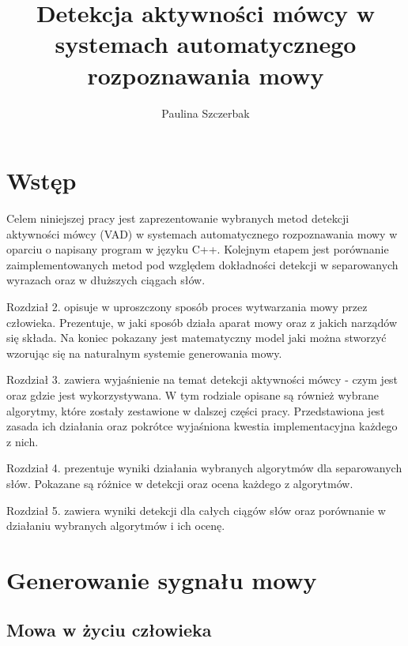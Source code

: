\documentclass[eng,printmode]{mgr}
\title{Detekcja aktywności mówcy w systemach automatycznego rozpoznawania mowy}
\author{Paulina Szczerbak}
\begin{document}

\maketitle %

\tableofcontents %

\chapter{Wstęp}
Celem niniejszej pracy jest zaprezentowanie wybranych metod detekcji aktywności mówcy (VAD) w systemach automatycznego rozpoznawania mowy w oparciu o napisany program w języku C++. Kolejnym etapem jest porównanie zaimplementowanych metod pod względem dokładności detekcji w separowanych wyrazach oraz w dłuższych ciągach słów.

Rozdział 2. opisuje w uproszczony sposób proces wytwarzania mowy przez człowieka. Prezentuje, w jaki sposób działa aparat mowy oraz z jakich narządów się składa. Na koniec pokazany jest matematyczny model jaki można stworzyć wzorując się na naturalnym systemie generowania mowy.

Rozdział 3. zawiera wyjaśnienie na temat detekcji aktywności mówcy - czym jest oraz gdzie jest wykorzystywana. W tym rodziale opisane są również wybrane algorytmy, które zostały zestawione w dalszej części pracy. Przedstawiona jest zasada ich działania oraz pokrótce wyjaśniona kwestia implementacyjna każdego z nich.
 
Rozdział 4. prezentuje wyniki działania wybranych algorytmów dla separowanych słów. Pokazane są różnice w detekcji oraz ocena każdego z algorytmów.

Rozdział 5. zawiera  wyniki detekcji dla całych ciągów słów oraz porównanie w działaniu wybranych algorytmów i ich ocenę.

\chapter{Generowanie sygnału mowy}
 \section{Mowa w życiu człowieka}
 
\end{document}
